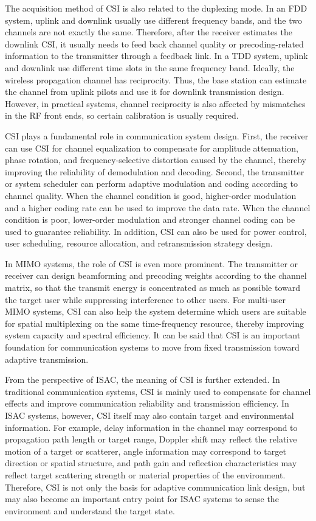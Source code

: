 The acquisition method of CSI is also related to the duplexing mode.
In an FDD system,
uplink and downlink usually use different frequency bands,
and the two channels are not exactly the same.
Therefore,
after the receiver estimates the downlink CSI,
it usually needs to feed back channel quality or precoding-related information to the transmitter through a feedback link.
In a TDD system,
uplink and downlink use different time slots in the same frequency band.
Ideally,
the wireless propagation channel has reciprocity.
Thus,
the base station can estimate the channel from uplink pilots
and use it for downlink transmission design.
However,
in practical systems,
channel reciprocity is also affected by mismatches in the RF front ends,
so certain calibration is usually required.

CSI plays a fundamental role in communication system design.
First,
the receiver can use CSI for channel equalization
to compensate for amplitude attenuation,
phase rotation,
and frequency-selective distortion caused by the channel,
thereby improving the reliability of demodulation and decoding.
Second,
the transmitter or system scheduler can perform adaptive modulation and coding according to channel quality.
When the channel condition is good,
higher-order modulation and a higher coding rate can be used to improve the data rate.
When the channel condition is poor,
lower-order modulation and stronger channel coding can be used to guarantee reliability.
In addition,
CSI can also be used for power control,
user scheduling,
resource allocation,
and retransmission strategy design.

In MIMO systems,
the role of CSI is even more prominent.
The transmitter or receiver can design beamforming and precoding weights according to the channel matrix,
so that the transmit energy is concentrated as much as possible toward the target user
while suppressing interference to other users.
For multi-user MIMO systems,
CSI can also help the system determine which users are suitable for spatial multiplexing
on the same time-frequency resource,
thereby improving system capacity and spectral efficiency.
It can be said that CSI is an important foundation for communication systems
to move from fixed transmission toward adaptive transmission.

From the perspective of ISAC,
the meaning of CSI is further extended.
In traditional communication systems,
CSI is mainly used to compensate for channel effects
and improve communication reliability and transmission efficiency.
In ISAC systems,
however,
CSI itself may also contain target and environmental information.
For example,
delay information in the channel may correspond to propagation path length or target range,
Doppler shift may reflect the relative motion of a target or scatterer,
angle information may correspond to target direction or spatial structure,
and path gain and reflection characteristics may reflect target scattering strength
or material properties of the environment.
Therefore,
CSI is not only the basis for adaptive communication link design,
but may also become an important entry point for ISAC systems
to sense the environment and understand the target state.

